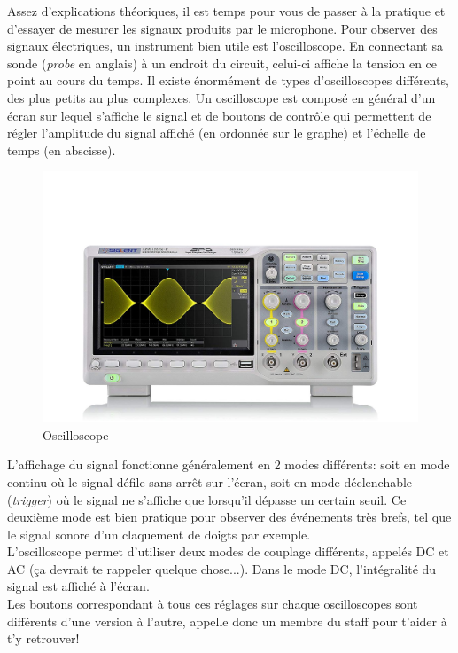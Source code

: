 
Assez d'explications théoriques, il est temps pour vous de passer à la pratique et d'essayer de mesurer les signaux produits par le microphone. Pour observer des signaux électriques, un instrument bien utile est l'oscilloscope. En connectant sa sonde (\textit{probe} en anglais) à un endroit du circuit, celui-ci affiche la tension en ce point au cours du temps. Il existe énormément de types d'oscilloscopes différents, des plus petits au plus complexes. Un oscilloscope est composé en général d'un écran sur lequel s'affiche le signal et de boutons de contrôle qui permettent de régler l'amplitude du signal affiché (en ordonnée sur le graphe) et l'échelle de temps (en abscisse). 

\begin{figure}[!ht]
	\centering
	\includegraphics[width=.6\textwidth]{figures/oscillo.jpg}
	\caption{Oscilloscope}
	\label{fig:oscillo}
\end{figure}

L'affichage du signal fonctionne généralement en 2 modes différents: soit en mode continu où le signal défile sans arrêt sur l'écran, soit en mode déclenchable (\textit{trigger}) où le signal ne s'affiche que lorsqu'il dépasse un certain seuil. Ce deuxième mode est bien pratique pour observer des événements très brefs, tel que le signal sonore d'un claquement de doigts par exemple. \\

L'oscilloscope permet d'utiliser deux modes de couplage différents, appelés DC et AC (ça devrait te rappeler quelque chose...). Dans le mode DC, l'intégralité du signal est affiché à l'écran. \\

Les boutons correspondant à tous ces réglages sur chaque oscilloscopes sont différents d'une version à l'autre, appelle donc un membre du staff pour t'aider à t'y retrouver!\\

